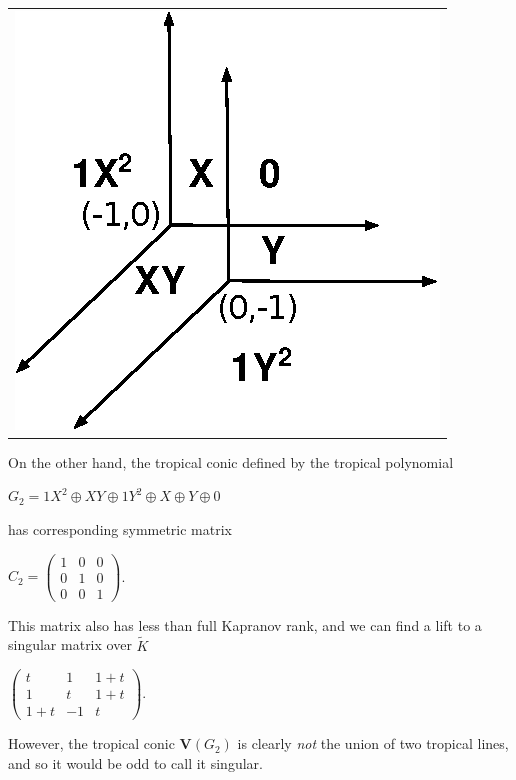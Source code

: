 \documentclass{article}
\begin{document}
\vspace{.1 in}
\begin{tabular}{c}
  \centering
  \hspace{1in}\includegraphics[scale=1]{Singular-Tropical-Conic.eps}
\end{tabular}

On the other hand, the tropical conic defined by the tropical polynomial
\begin{center}
  $G_{2} = 1X^{2} \oplus XY \oplus 1Y^{2} \oplus X \oplus Y \oplus 0$
\end{center}
has corresponding symmetric matrix
\begin{center}
  $C_{2} = \left(\begin{array}{ccc} 1 & 0 & 0 \\ 0 & 1 & 0 \\ 0 & 0 & 1 \end{array}\right)$.
\end{center}
This matrix also has less than full Kapranov rank, and we can find a lift to a singular matrix over $\tilde{K}$
\begin{center}
  $\left(\begin{array}{ccc} t & 1 & 1+t \\ 1 & t & 1+t \\ 1+t & -1 & t \end{array}\right)$.
\end{center}
However, the tropical conic $\textbf{V}(G_{2})$ is clearly \emph{not} the union of two tropical lines, and so it would be odd to call it singular.
\end{document}
